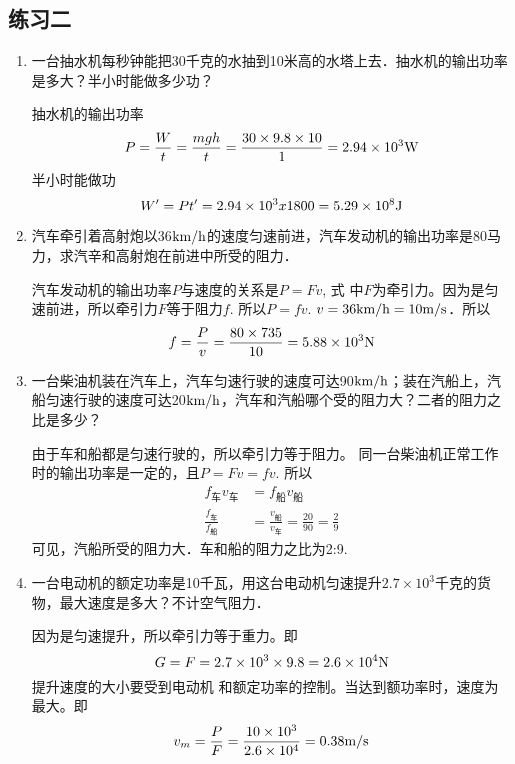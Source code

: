 \subsection{练习二}
\begin{enumerate}
    \item 一台抽水机每秒钟能把30千克的水抽到10米高的水塔上去．抽水机的输出功率是多大？半小时能做多少功？

    \begin{solution}
        抽水机的输出功率
\[P=\frac{W}{t}=\frac{mgh}{t}=\frac{30\times 9.8\times 10}{1}=2.94\times 10^3{\rm W}\]
半小时能做功
\[W'=Pt'=2.94\times10^3x1800=5.29\times10^8{\rm J}\]
    \end{solution}
    \item 汽车牵引着高射炮以36$\text{km}/\text{h}$的速度匀速前进，汽车发动机的输出功率是80马力，求汽辛和高射炮在前进中所受的阻力．

    \begin{solution}
        汽车发动机的输出功率$P$与速度的关系是$P=Fv$, 式
        中$F$为牵引力。因为是匀速前进，所以牵引力$F$等于阻力$f$.
        所以$P=fv$. $v=36\text{km}/\text{h}=10\text{m}/\text{s}$．所以
        \[f=\frac{P}{v}=\frac{80\times 735}{10}=5.88\times 10^{3}{\rm N}\]
    \end{solution}
    \item 一台柴油机装在汽车上，汽车匀速行驶的速度可达90$\text{km}/\text{h}$；装在汽船上，汽船匀速行驶的速度可达20$\text{km}/\text{h}$，汽车和汽船哪个受的阻力大？二者的阻力之比是多少？

    \begin{solution}
    由于车和船都是匀速行驶的，所以牵引力等于阻力。
同一台柴油机正常工作时的输出功率是一定的，且$P=Fv=
fv$. 所以
\[\begin{split}
    f_{\text{车}}v_{\text{车}}&=f_{\text{船}}v_{\text{船}}\\
    \frac{f_{\text{车}}}{f_{\text{船}}}&=\frac{v_{\text{船}}}{v_{\text{车}}}=\frac{20}{90}=\frac{2}{9}
\end{split}\]
可见，汽船所受的阻力大．车和船的阻力之比为2:9.
    \end{solution}
    \item 一台电动机的额定功率是10千瓦，用这台电动机匀速提升$2.7\times 10^3$千克的货物，最大速度是多大？不计空气阻力．

    \begin{solution}
因为是匀速提升，所以牵引力等于重力。即
\[G=F=
2.7\times10^3\times9.8=2.6\times10^4{\rm N}\]
提升速度的大小要受到电动机
和额定功率的控制。当达到额功率时，速度为最大。即
\[v_m=\frac{P}{F}=\frac{10\times 10^3}{2.6\times 10^4}=0.38\text{m}/\text{s}\]
    \end{solution}
\end{enumerate}



